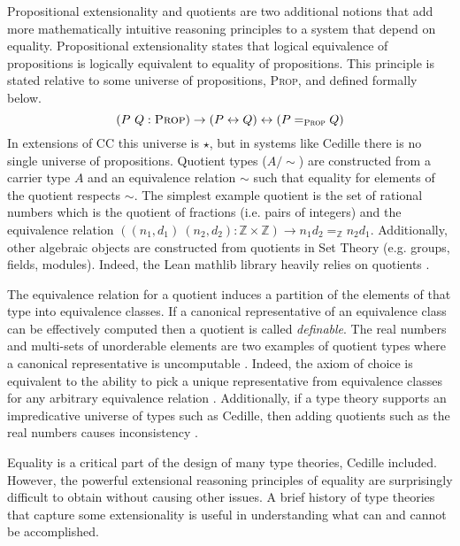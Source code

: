 Propositional extensionality and quotients are two additional notions that add more mathematically intuitive reasoning principles to a system that depend on equality.
Propositional extensionality states that logical equivalence of propositions is logically equivalent to equality of propositions.
This principle is stated relative to some universe of propositions, \textsc{Prop}, and defined formally below.
$$(P\ Q : \textsc{Prop}) \to (P \leftrightarrow Q) \leftrightarrow (P =_\textsc{Prop} Q)$$
In extensions of CC this universe is $\star$, but in systems like Cedille there is no single universe of propositions.
Quotient types ($A/\!\!\sim$) are constructed from a carrier type $A$ and an equivalence relation $\sim$ such that equality for elements of the quotient respects $\sim$.
The simplest example quotient is the set of rational numbers which is the quotient of fractions (i.e. pairs of integers) and the equivalence relation $((n_1, d_1)\ (n_2, d_2) : \mathbb{Z \times Z}) \to n_1d_2 =_{\mathbb{Z}} n_2d_1$.
Additionally, other algebraic objects are constructed from quotients in Set Theory (e.g. groups, fields, modules).
Indeed, the Lean mathlib library heavily relies on quotients \cite{mathlib}.

The equivalence relation for a quotient induces a partition of the elements of that type into equivalence classes.
If a canonical representative of an equivalence class can be effectively computed then a quotient is called \textit{definable}.
The real numbers and multi-sets of unorderable elements are two examples of quotient types where a canonical representative is uncomputable \cite{li2015}.
Indeed, the axiom of choice is equivalent to the ability to pick a unique representative from equivalence classes for any arbitrary equivalence relation \cite{lof2009}.
Additionally, if a type theory supports an impredicative universe of types such as Cedille, then adding quotients such as the real numbers causes inconsistency \cite{chicli2002}.

Equality is a critical part of the design of many type theories, Cedille included.
However, the powerful extensional reasoning principles of equality are surprisingly difficult to obtain without causing other issues.
A brief history of type theories that capture some extensionality is useful in understanding what can and cannot be accomplished.


